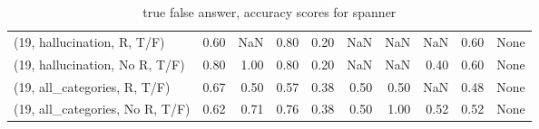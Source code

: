 \begin{table*}[h!]
\begin{adjustbox}{width=2\columnwidth,center}
\begin{tabular}{lrrr|rrr|rrr}
(19, hallucination, R, T/F)           &                      0.60 &                   NaN &                      0.80 &                          0.20 &                       NaN &                           NaN &                                    NaN &                               0.60 &                                  None \\
(19, hallucination, No R, T/F)        &                      0.80 &                  1.00 &                      0.80 &                          0.20 &                       NaN &                           NaN &                                   0.40 &                               0.60 &                                  None \\
(19, all\_categories, R, T/F)          &                      0.67 &                  0.50 &                      0.57 &                          0.38 &                      0.50 &                          0.50 &                                    NaN &                               0.48 &                                  None \\
(19, all\_categories, No R, T/F)       &                      0.62 &                  0.71 &                      0.76 &                          0.38 &                      0.50 &                          1.00 &                                   0.52 &                               0.52 &                                  None \\


\bottomrule
\end{tabular}
\end{adjustbox}
\caption{true false answer, accuracy scores for spanner}
\end{table*}
